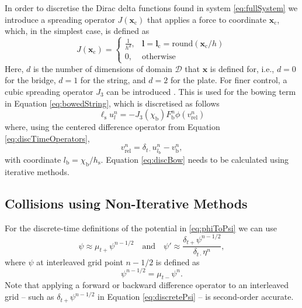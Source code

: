 \documentclass[dvipsnames, pdftex]{article}
\def\stringx{\chi}
\def\us{u}
\begin{document}
In order to discretise the Dirac delta functions found in system \eqref{eq:fullSystem} we introduce a spreading operator $J(\boldsymbol{x}_\text{c})$ that applies a force to coordinate $\boldsymbol{x}_\text{c}$, which, in the simplest case, is defined as \cite{bilbao2009numerical}
\begin{equation}
   J(\boldsymbol{x}_\text{c}) = \begin{cases}
       \frac{1}{h^d}, & \boldsymbol{l} = \boldsymbol{l}_\text{c} = \text{round}(\boldsymbol{x}_\text{c} / h)\\
       0, & \text{otherwise}
   \end{cases}
\end{equation}
Here, $d$ is the number of dimensions of domain $\mathcal{D}$ that $\boldsymbol{x}$ is defined for, i.e., $d=0$ for the bridge, $d=1$ for the string, and $d=2$ for the plate. For finer control, a cubic spreading operator $J_3$ can be introduced \cite{bilbao2009numerical}. This is used for the bowing term in Equation \eqref{eq:bowedString}, which is discretised as follows
\begin{equation}
    \ell_\text{s}\us^n_l = -J_3(\stringx_\text{b})F_\text{b}^n\phi(v_\text{rel}^n)
\end{equation}
where, using the centered difference operator from Equation \eqref{eq:discTimeOperators},
\begin{equation}\label{eq:discBow}
    v_\text{rel}^n = \delta_{t\cdot}\us_{l_\text{b}}^n-v_\text{b}^n,
\end{equation}
with coordinate $l_\text{b} = \stringx_\text{b}/h_\text{s}$. Equation \eqref{eq:discBow} needs to be calculated using iterative methods.

\subsection{Collisions using Non-Iterative Methods}

For the discrete-time definitions of the potential in \eqref{eq:phiToPsi} we can use 
\begin{equation}\label{eq:discretePsi}
    \psi\approx \mu_{t+}\psi^{n-1/2}\quad \text{and} \quad \psi' \approx \frac{\delta_{t+}\psi^{n-1/2}}{\delta_{t\cdot}\eta^n},
\end{equation}
where $\psi$ at interleaved grid point $n-1/2$ is defined as
\begin{equation}
    \psi^{n-1/2} = \mu_{t-}\psi^n.
\end{equation}
Note that applying a forward or backward difference operator to an interleaved grid -- such as $\delta_{t+}\psi^{n-1/2}$ in Equation \eqref{eq:discretePsi} -- is second-order accurate.
\end{document}
